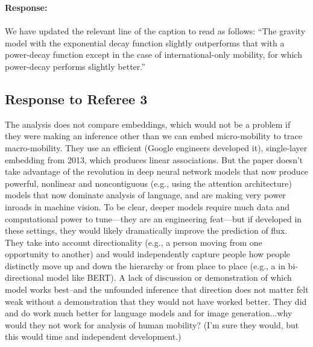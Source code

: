 \documentclass[12pt,a4paper]{article}
\newcommand{\response}[1]{{\noindent \textbf{Response:} \\ \\ \noindent #1}}
\newcommand{\rcomment}[1]{%
\vspace{10pt}
\begin{tcolorbox}[colback=black!3,colframe=white!45!black, left=0pt, right=0pt, top=0pt, bottom=0pt, arc=0pt,outer arc=0pt, grow to left by=-0.5cm,grow to right by=-0.5cm]
#1
\end{tcolorbox}
}
\begin{document}
\response{We have updated the relevant line of the caption to read as follows: 
“The gravity model with the exponential decay function slightly outperforms that with a power-decay function except in the case of international-only mobility, for which power-decay performs slightly better.”
}

\subsection{Response to Referee 3}

\rcomment{The analysis does not compare embeddings, which would not be a problem if they were making
an inference other than we can embed micro-mobility to trace macro-mobility. They use an
efficient (Google engineers developed it), single-layer embedding from 2013, which produces
linear associations. But the paper doesn’t take advantage of the revolution in deep neural
network models that now produce powerful, nonlinear and noncontiguous (e.g., using the
attention architecture) models that now dominate analysis of language, and are making very
power inroads in machine vision. To be clear, deeper models require much data and computational power to tune—they are an engineering feat—but if developed in these settings, they would likely dramatically improve the prediction of flux. They take into account directionality (e.g., a person moving from one opportunity to another) and would independently capture people how people distinctly move up and down the hierarchy or from place to place (e.g., a in bi-directional model like BERT). A lack of discussion or demonstration of which model works best--and the unfounded inference that direction does not matter felt weak without a demonstration that they would not have worked better. They did and do work much better for language models and for image generation...why would they not work for analysis of human mobility? (I’m sure they would, but this would time and independent development.)
}
\end{document}
